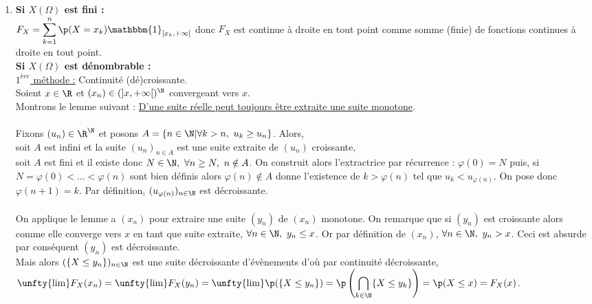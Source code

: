 \documentclass[8pt]{book}
\begin{document}
\begin{enumerate}
		Soit $x\leq \min\{s_n,\ n\in \crblanc{0}{M}\}$.\\
		$(\forall n\in \crblanc{0}{M},\ \mathbbm{1}_{[s_n,+\infty[}(x)=0)\implies\displaystyle\sum\limits_{n=0}^{+\infty}\p(X=s_n)\mathbbm{1}_{[s_n,+\infty[}(x)\leq R_M\leq \varepsilon$.\\
		Ainsi, $\underset{x\to -\infty}{\lim}F_X(x)=0$.
		\item \textbf{Si $X(\Omega)$ est fini :}\\
		$F_X=\displaystyle\sum\limits_{k=1}^n\p(X=x_k)\mathbbm{1}_{[x_k,+\infty[}$ donc $F_X$ est continue à droite en tout point comme somme (finie) de fonctions continues à droite en tout point.\\
		\textbf{Si $X(\Omega)$ est dénombrable :}\\
		\underline{$1^{ère}$ méthode :} Continuité (dé)croissante.\\
		Soient $x\in \R$ et $(x_n)\in (]x,+\infty[)^\N$ convergeant vers $x$.\\
		Montrons le lemme suivant : \underline{D'une suite réelle peut toujours être extraite une suite monotone}.\\\\
		Fixons $(u_n)\in \R^\N$ et posons $A=\{n\in \N|\forall k>n,\ u_k\geq u_n\}$. Alors,\\
		soit $A$ est infini et la suite $(u_n)_{n\in A}$ est une suite extraite de $(u_n)$ croissante,\\
		soit $A$ est fini et il existe donc $N\in \N,\ \forall n\geq N,\ n\notin A$. On construit alors l'extractrice par récurrence : $\varphi(0)=N$ puis, si $N=\varphi(0)<\dots<\varphi(n)$ sont bien définis alors $\varphi(n)\notin A$ donne l'existence de $k>\varphi(n)$ tel que $u_k<u_{\varphi(n)}$. On pose donc $\varphi(n+1)=k$. Par définition, $(u_{\varphi(n)})_{n\in \N}$ est décroissante.\\\\
		On applique le lemme a $(x_n)$ pour extraire une suite $(y_n)$ de $(x_n)$ monotone. On remarque que si $(y_n)$ est croissante alors comme elle converge vers $x$ en tant que suite extraite, $\forall n\in \N,\ y_n\leq x$. Or par définition de $(x_n)$, $\forall n\in \N,\ y_n>x$. Ceci est absurde par conséquent $(y_n)$ est décroissante.\\
		Mais alors $(\{X\leq y_n\})_{n\in \N}$ est une suite décroissante d'évènements d'où par continuité décroissante,\\
		$\unfty{\lim}F_X(x_n)=\unfty{\lim}F_X(y_n)=\unfty{\lim}\p(\{X\leq y_n\})=\p\left(\displaystyle\bigcap\limits_{k\in \N}\{X\leq y_k\}\right)=\p(X\leq x)=F_X(x)$.\\

\end{enumerate}
\end{document}
